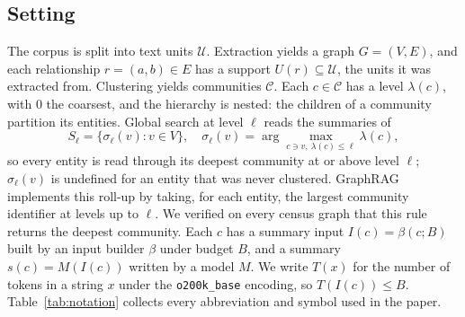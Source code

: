 \documentclass[journal]{IEEEtran}
\theoremstyle{remark}
\newcommand{\Sel}{\sigma_\ell}
\newcommand{\In}{I}
\newcommand{\tok}{T}
\begin{document}
\subsection{Setting}
The corpus is split into text units $\mathcal U$. Extraction yields a graph $G=(V,E)$, and each relationship $r=(a,b)\in E$ has a support $U(r)\subseteq\mathcal U$, the units it was extracted from. Clustering yields communities $\mathcal C$. Each $c\in\mathcal C$ has a level $\lambda(c)$, with $0$ the coarsest, and the hierarchy is nested: the children of a community partition its entities. Global search at level $\ell$ reads the summaries of
\begin{equation}
S_\ell=\{\Sel(v): v\in V\},\quad \Sel(v)=\arg\max_{c\ni v,\ \lambda(c)\le\ell}\lambda(c),
\end{equation}
so every entity is read through its deepest community at or above level $\ell$; $\Sel(v)$ is undefined for an entity that was never clustered. GraphRAG implements this roll-up by taking, for each entity, the largest community identifier at levels up to $\ell$. We verified on every census graph that this rule returns the deepest community. Each $c$ has a summary input $\In(c)=\beta(c;B)$ built by an input builder $\beta$ under budget $B$, and a summary $s(c)=M(\In(c))$ written by a model $M$. We write $\tok(x)$ for the number of tokens in a string $x$ under the \texttt{o200k\_base} encoding, so $\tok(\In(c))\le B$. Table~\ref{tab:notation} collects every abbreviation and symbol used in the paper.
\end{document}
